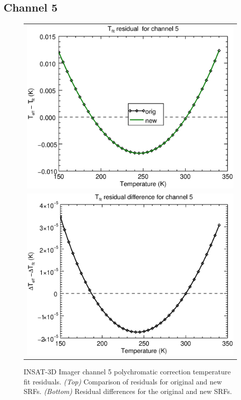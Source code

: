 \subsection{Channel 5}
\begin{figure}[H]
  \centering
  \begin{tabular}{c}
    \includegraphics[scale=0.55]{graphics/imgr/tfit/imgr_insat3d-5.tfit.eps} \\
    \includegraphics[scale=0.55]{graphics/imgr/tfit/imgr_insat3d-5.tfit.difference.eps}
  \end{tabular}
  \caption{INSAT-3D Imager channel 5 polychromatic correction temperature fit residuals. \emph{(Top)} Comparison of residuals for original and new SRFs. \emph{(Bottom)} Residual differences for the original and new SRFs.}
  \label{fig:imgr_ch5_tfit}
\end{figure}


